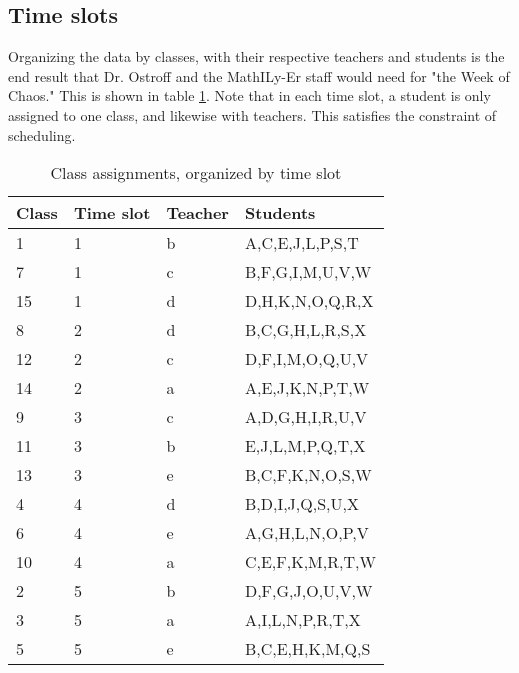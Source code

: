 \documentclass[11pt]{article}
\begin{document}
\subsection{Time slots}
Organizing the data by classes, with their respective teachers and students is the end result that Dr. Ostroff and the MathILy-Er staff would need for "the Week of Chaos." This is shown in table \ref{table:ass}. Note that in each time slot, a student is only assigned to one class, and likewise with teachers. This satisfies the constraint of scheduling.\\
\begin{table}[h]
\hspace*{1.5cm}
\begin{tabular}{|l|l|l|l|} \hline
\rowcolor{gray!45}
Class & Time slot & Teacher & Students \\ \hline \hline
1 & 1 & b & A,C,E,J,L,P,S,T \\ \hline
7 & 1 & c & B,F,G,I,M,U,V,W \\ \hline
15 & 1 & d & D,H,K,N,O,Q,R,X \\ \hline
\rowcolor{gray!30}
8 & 2 & d & B,C,G,H,L,R,S,X \\ \hline
\rowcolor{gray!30}
12 & 2 & c & D,F,I,M,O,Q,U,V \\ \hline
\rowcolor{gray!30}
14 & 2 & a & A,E,J,K,N,P,T,W \\ \hline
9 & 3 & c & A,D,G,H,I,R,U,V \\ \hline
11 & 3 & b & E,J,L,M,P,Q,T,X \\ \hline
13 & 3 & e & B,C,F,K,N,O,S,W \\ \hline
\rowcolor{gray!30}
4 & 4 & d & B,D,I,J,Q,S,U,X \\ \hline
\rowcolor{gray!30}
6 & 4 & e & A,G,H,L,N,O,P,V \\ \hline
\rowcolor{gray!30}
10 & 4 & a & C,E,F,K,M,R,T,W \\ \hline
2 & 5 & b & D,F,G,J,O,U,V,W \\ \hline
3 & 5 & a & A,I,L,N,P,R,T,X \\ \hline
5 & 5 & e & B,C,E,H,K,M,Q,S \\ \hline
\end{tabular}
\caption{Class assignments, organized by time slot}
\label{table:ass}
\end{table}
\FloatBarrier
\end{document}
